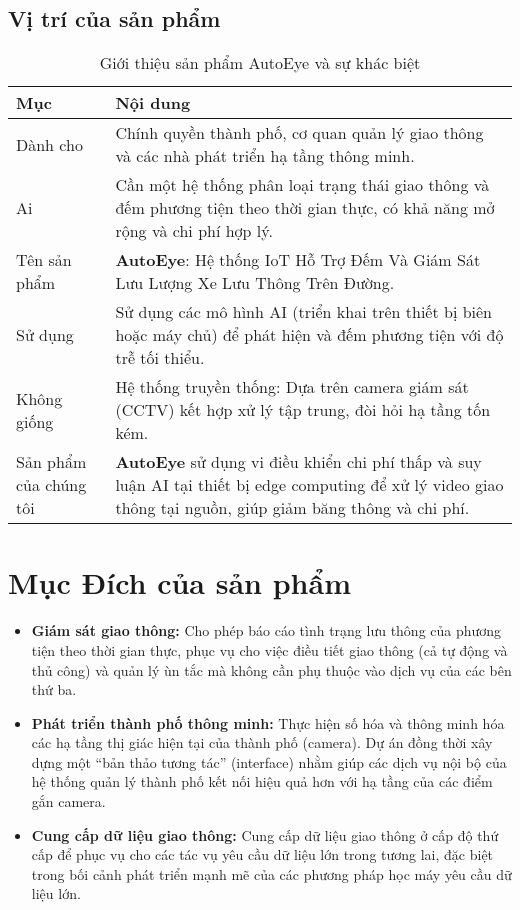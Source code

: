 \subsection{Vị trí của sản phẩm}
\begin{table}[h!]
    \centering
    \begin{tabular}{|p{4cm}|p{10cm}|}
    \hline
    \textbf{Mục} & \textbf{Nội dung} \\
    \hline
    Dành cho & Chính quyền thành phố, cơ quan quản lý giao thông và các nhà phát triển hạ tầng thông minh. \\
    \hline
    Ai & Cần một hệ thống phân loại trạng thái giao thông và đếm phương tiện theo thời gian thực, có khả năng mở rộng và chi phí hợp lý. \\
    \hline
    Tên sản phẩm & \textbf{AutoEye}: Hệ thống IoT Hỗ Trợ Đếm Và Giám Sát Lưu Lượng Xe Lưu Thông Trên Đường. \\
    \hline
    Sử dụng & Sử dụng các mô hình AI (triển khai trên thiết bị biên hoặc máy chủ) để phát hiện và đếm phương tiện với độ trễ tối thiểu. \\
    \hline
    Không giống & Hệ thống truyền thống: Dựa trên camera giám sát (CCTV) kết hợp xử lý tập trung, đòi hỏi hạ tầng tốn kém. \\
    \hline
    Sản phẩm của chúng tôi & \textbf{AutoEye} sử dụng vi điều khiển chi phí thấp và suy luận AI tại thiết bị edge computing để xử lý video giao thông tại nguồn, giúp giảm băng thông và chi phí. \\
    \hline
    \end{tabular}
    \caption{Giới thiệu sản phẩm AutoEye và sự khác biệt}
    \label{tab:autoeye_overview}
\end{table}

\section{Mục Đích của sản phẩm}
\begin{itemize}
    \item \textbf{Giám sát giao thông:} Cho phép báo cáo tình trạng lưu thông của phương tiện theo thời gian thực, phục vụ cho việc điều tiết giao thông (cả tự động và thủ công) và quản lý ùn tắc mà không cần phụ thuộc vào dịch vụ của các bên thứ ba.
    
    \item \textbf{Phát triển thành phố thông minh:} Thực hiện số hóa và thông minh hóa các hạ tầng thị giác hiện tại của thành phố (camera). Dự án đồng thời xây dựng một “bản thảo tương tác” (interface) nhằm giúp các dịch vụ nội bộ của hệ thống quản lý thành phố kết nối hiệu quả hơn với hạ tầng của các điểm gắn camera.

    \item \textbf{Cung cấp dữ liệu giao thông:} Cung cấp dữ liệu giao thông ở cấp độ thứ cấp để phục vụ cho các tác vụ yêu cầu dữ liệu lớn trong tương lai, đặc biệt trong bối cảnh phát triển mạnh mẽ của các phương pháp học máy yêu cầu dữ liệu lớn.
\end{itemize}

